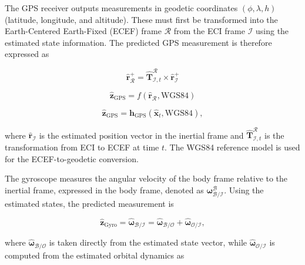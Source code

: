 \noindent 
The GPS receiver outputs measurements in geodetic coordinates $(\phi, \lambda, h)$ (latitude, longitude, and altitude). 
These must first be transformed into the Earth-Centered Earth-Fixed (ECEF) frame $\mathcal{R}$ from the ECI frame $\mathcal{I}$ 
using the estimated state information. The predicted GPS measurement is therefore expressed as

\begin{equation}
    \mathbf{\hat{r}}_{\mathcal{R}}^+ = \mathbf{\hat{T}}_{\mathcal{I},t}^\mathcal{R} \times \mathbf{\hat{r}}_{\mathcal{I}}^+
\end{equation}

\begin{equation}
    \mathbf{\hat{z}}_{\text{GPS}} = f(\mathbf{\hat{r}}_{\mathcal{R}},\text{WGS84})
\end{equation}

\begin{equation}
    \mathbf{\hat{z}}_{\text{GPS}} = \mathbf{h}_{\text{GPS}}(\mathbf{\hat{x}}_t,\text{WGS84}),
\end{equation}

\noindent where $\mathbf{\hat{r}}_\mathcal{I}$ is the estimated position vector in the inertial frame and 
$\mathbf{\hat{T}}_{\mathcal{I},t}^\mathcal{R}$ is the transformation from ECI to ECEF at time $t$. 
The WGS84 reference model is used for the ECEF-to-geodetic conversion.

\label{sec:GyroMeasModel}

\noindent The gyroscope measures the angular velocity of the body frame relative to the inertial frame, expressed in the body frame, 
denoted as $\boldsymbol{\omega}^\mathcal{B}_\mathcal{B/I}$. Using the estimated states, the predicted measurement is

\begin{equation}
    \mathbf{\hat{z}}_\text{Gyro} = \boldsymbol{\hat{\omega}}_\mathcal{B/I} 
    = \boldsymbol{\hat{\omega}}_\mathcal{B/O} + \boldsymbol{\hat{\omega}}_\mathcal{O/I},
\end{equation}

\noindent where $\boldsymbol{\hat{\omega}}_\mathcal{B/O}$ is taken directly from the estimated state vector, while 
$\boldsymbol{\hat{\omega}}_\mathcal{O/I}$ is computed from the estimated orbital dynamics as

